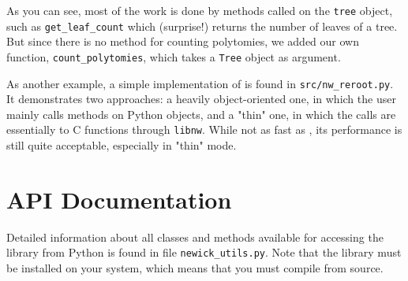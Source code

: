 As you can see, most of the work is done by methods called on the \texttt{tree}
object, such as \texttt{get\_leaf\_count} which (surprise!) returns the number
of leaves of a tree. But since there is no method for counting polytomies, we
added our own function, \texttt{count\_polytomies}, which takes a \texttt{Tree}
object as argument.

As another example, a simple implementation of \reroot{} is found in
\texttt{src/nw\_reroot.py}. It demonstrates two approaches: a heavily
object-oriented one, in which the user mainly calls methods on Python objects,
and a "thin" one, in which the calls are essentially to C functions through
\texttt{libnw}. While not as fast as \reroot{}, its performance is still quite
acceptable, especially in "thin" mode.

\section{API Documentation}

\noindent{}Detailed information about all classes and methods available for accessing the \nutils{} library from Python is found in file \texttt{newick\_utils.py}. Note that the library must be installed on your system, which means that you must compile from source.
